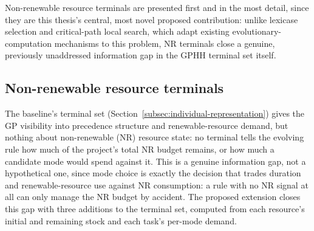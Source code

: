 Non-renewable resource terminals are presented first and in the most
detail, since they are this thesis's central, most novel proposed
contribution: unlike lexicase selection and critical-path local search,
which adapt existing evolutionary-computation mechanisms to this problem,
NR terminals close a genuine, previously unaddressed information gap in
the GPHH terminal set itself.

\subsection{Non-renewable resource terminals}
\label{subsec:nr-terminals-definition}

The baseline's terminal set (Section~\ref{subsec:individual-representation})
gives the GP visibility into precedence structure and renewable-resource
demand, but nothing about non-renewable (NR) resource state: no terminal
tells the evolving rule how much of the project's total NR budget remains,
or how much a candidate mode would spend against it. This is a genuine
information gap, not a hypothetical one, since mode choice is exactly the
decision that trades duration and renewable-resource use against NR
consumption: a rule with no NR signal at all can only manage the NR budget
by accident. The proposed extension closes this
gap with three additions to the terminal set, computed from each resource's
initial and remaining stock and each task's per-mode demand.

